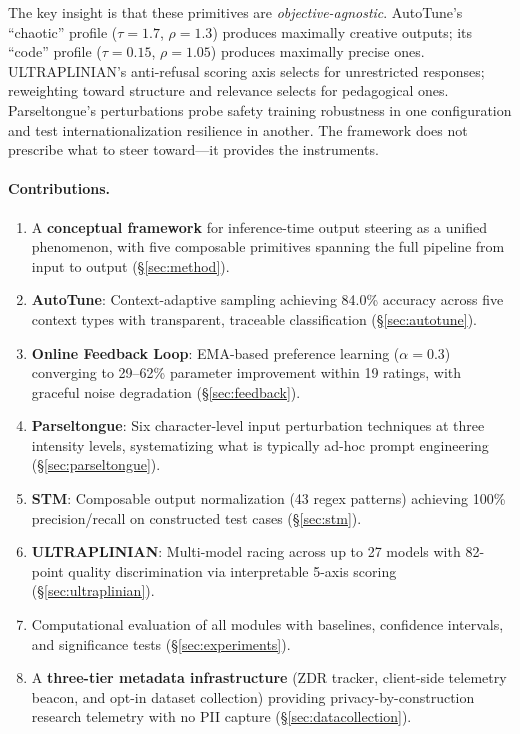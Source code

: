 \documentclass[11pt]{article}
\begin{document}
The key insight is that these primitives are \emph{objective-agnostic}. AutoTune's ``chaotic'' profile ($\tau=1.7$, $\rho=1.3$) produces maximally creative outputs; its ``code'' profile ($\tau=0.15$, $\rho=1.05$) produces maximally precise ones. ULTRAPLINIAN's anti-refusal scoring axis selects for unrestricted responses; reweighting toward structure and relevance selects for pedagogical ones. Parseltongue's perturbations probe safety training robustness in one configuration and test internationalization resilience in another. The framework does not prescribe what to steer toward---it provides the instruments.

\paragraph{Contributions.}
\begin{enumerate}
    \item A \textbf{conceptual framework} for inference-time output steering as a unified phenomenon, with five composable primitives spanning the full pipeline from input to output (\S\ref{sec:method}).
    \item \textbf{AutoTune}: Context-adaptive sampling achieving 84.0\% accuracy across five context types with transparent, traceable classification (\S\ref{sec:autotune}).
    \item \textbf{Online Feedback Loop}: EMA-based preference learning ($\alpha=0.3$) converging to 29--62\% parameter improvement within 19 ratings, with graceful noise degradation (\S\ref{sec:feedback}).
    \item \textbf{Parseltongue}: Six character-level input perturbation techniques at three intensity levels, systematizing what is typically ad-hoc prompt engineering (\S\ref{sec:parseltongue}).
    \item \textbf{STM}: Composable output normalization (43 regex patterns) achieving 100\% precision/recall on constructed test cases (\S\ref{sec:stm}).
    \item \textbf{ULTRAPLINIAN}: Multi-model racing across up to 27 models with 82-point quality discrimination via interpretable 5-axis scoring (\S\ref{sec:ultraplinian}).
    \item Computational evaluation of all modules with baselines, confidence intervals, and significance tests (\S\ref{sec:experiments}).
    \item A \textbf{three-tier metadata infrastructure} (ZDR tracker, client-side telemetry beacon, and opt-in dataset collection) providing privacy-by-construction research telemetry with no PII capture (\S\ref{sec:datacollection}).
\end{enumerate}
\end{document}
